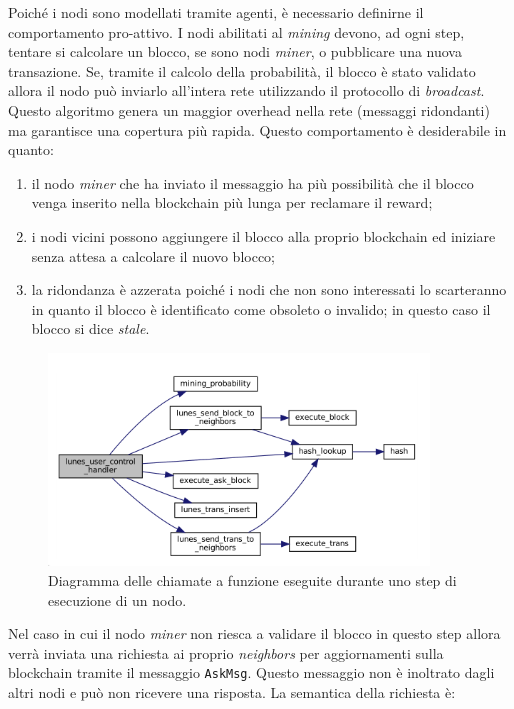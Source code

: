 \begin{code}
Poiché i nodi sono modellati tramite agenti, è necessario definirne il comportamento pro-attivo.\newline
I nodi abilitati al \textit{mining} devono, ad ogni step, tentare si calcolare un blocco, se sono nodi \textit{miner}, o pubblicare una nuova transazione. Se, tramite il calcolo della probabilità, il blocco è stato validato allora il nodo può inviarlo all'intera rete utilizzando il protocollo di \textit{broadcast}. Questo algoritmo genera un maggior overhead nella rete (messaggi ridondanti) ma garantisce una copertura più rapida. Questo comportamento è desiderabile in quanto:
\begin{enumerate}
    \item il nodo \textit{miner} che ha inviato il messaggio ha più possibilità che il blocco venga inserito nella blockchain più lunga per reclamare il reward;
    \item i nodi vicini possono aggiungere il blocco alla proprio blockchain ed iniziare senza attesa a calcolare il nuovo blocco;
    \item la ridondanza è azzerata poiché i nodi che non sono interessati lo scarteranno in quanto il blocco è identificato come obsoleto o invalido; in questo caso il blocco si dice \textit{stale}.
\end{enumerate}
\begin{figure}
    \centering
    \includegraphics[width=0.9\textwidth]{./images/graphcall_node_routine.png}
    \caption{Diagramma delle chiamate a funzione eseguite durante uno step di esecuzione di un nodo.}
\end{figure}
Nel caso in cui il nodo \textit{miner} non riesca a validare il blocco in questo step allora verrà inviata una richiesta ai proprio \textit{neighbors} per aggiornamenti sulla blockchain tramite il messaggio \texttt{AskMsg}. Questo messaggio non è inoltrato dagli altri nodi e può non ricevere una risposta. La semantica della richiesta è: 

\end{code}
